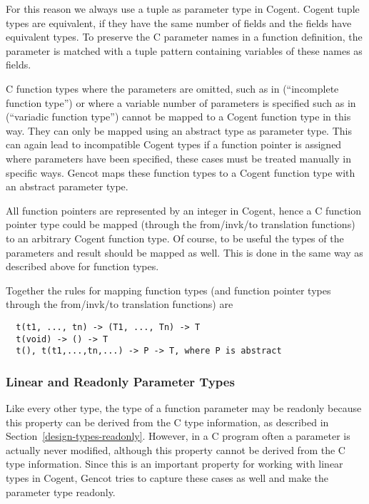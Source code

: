 For this reason we always use a tuple as parameter type in Cogent. Cogent tuple types are equivalent, if they
have the same number of fields and the fields have equivalent types. To preserve the C parameter names in 
a function definition, the parameter is matched with a tuple pattern containing variables of these
names as fields.

C function types where the parameters are omitted, such as in  (``incomplete function type'') 
or where a variable number of
parameters is specified such as in  (``variadic function type'') cannot be mapped to a Cogent 
function type in this way. 
They can only be mapped using an abstract type as parameter type. This can again lead to incompatible 
Cogent types if a function pointer is assigned where parameters have been specified, these cases must 
be treated manually in specific ways. Gencot maps these function types to a Cogent function type with an abstract
parameter type.

All function pointers are represented by an integer in Cogent, hence a C function pointer type could be 
mapped (through the from/invk/to translation functions) to an arbitrary Cogent function type.
Of course, to be useful the types of the parameters and result should be mapped as well. This is done
in the same way as described above for function types.

Together the rules for mapping function types (and function pointer types through the from/invk/to translation 
functions) are
\begin{verbatim}
  t(t1, ..., tn) -> (T1, ..., Tn) -> T
  t(void) -> () -> T
  t(), t(t1,...,tn,...) -> P -> T, where P is abstract
\end{verbatim}

\subsubsection{Linear and Readonly Parameter Types}

Like every other type, the type of a function parameter may be readonly because this property can be derived
from the C type information, as described in Section~\ref{design-types-readonly}. However, in a C program 
often a parameter is actually never modified, although this property cannot be derived from the C type information.
Since this is an important property for working with linear types in Cogent, Gencot tries to capture these
cases as well and make the parameter type readonly.

